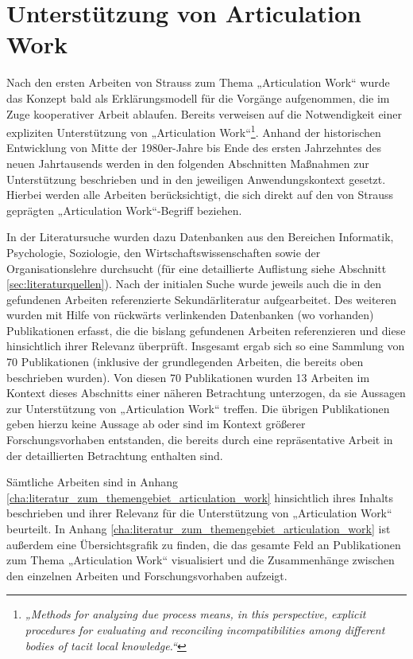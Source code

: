 
\section{Unterstützung von Articulation Work} %
\label{sec:unterstützung_von_articulation_work}

Nach den ersten Arbeiten von Strauss zum Thema „Articulation Work“ wurde das Konzept bald als Erklärungsmodell für die Vorgänge aufgenommen, die im Zuge kooperativer Arbeit ablaufen. Bereits \citeyear{Gerson86} verweisen \citeauthor{Gerson86} auf die Notwendigkeit einer expliziten Unterstützung von „Articulation Work“\footnote{\emph{„Methods for analyzing 
due process means, in this perspective, explicit procedures for evaluating and reconciling incompatibilities among different bodies of tacit local knowledge.“}\citep[][S. 266]{Gerson86}}. Anhand der historischen Entwicklung von Mitte der 1980er-Jahre bis Ende des ersten Jahrzehntes des neuen Jahrtausends werden in den folgenden Abschnitten Maßnahmen zur Unterstützung beschrieben und in den jeweiligen Anwendungskontext gesetzt. Hierbei werden alle Arbeiten berücksichtigt, die sich direkt auf den von Strauss geprägten „Articulation Work“-Begriff beziehen. 

In der Literatursuche wurden dazu Datenbanken aus den Bereichen Informatik, Psychologie, Soziologie, den Wirtschaftswissenschaften sowie der Organisationslehre durchsucht (für eine detaillierte Auflistung siehe Abschnitt \ref{sec:literaturquellen}). Nach der initialen Suche wurde jeweils auch die in den gefundenen Arbeiten referenzierte Sekundärliteratur aufgearbeitet. Des weiteren wurden mit Hilfe von rückwärts verlinkenden Datenbanken (wo vorhanden) Publikationen erfasst, die die bislang gefundenen Arbeiten referenzieren und diese hinsichtlich ihrer Relevanz überprüft. Insgesamt ergab sich so eine Sammlung von 70 Publikationen (inklusive der grundlegenden Arbeiten, die bereits oben beschrieben wurden). Von diesen 70 Publikationen wurden 13 Arbeiten im Kontext dieses Abschnitts einer näheren Betrachtung unterzogen, da sie Aussagen zur Unterstützung von „Articulation Work“ treffen. Die übrigen Publikationen geben hierzu keine Aussage ab oder sind im Kontext größerer Forschungsvorhaben entstanden, die bereits durch eine repräsentative Arbeit in der detaillierten Betrachtung enthalten sind. 

Sämtliche Arbeiten sind in Anhang \ref{cha:literatur_zum_themengebiet_articulation_work} hinsichtlich ihres Inhalts beschrieben und ihrer Relevanz für die Unterstützung von „Articulation Work“ beurteilt. In Anhang \ref{cha:literatur_zum_themengebiet_articulation_work} ist außerdem eine Übersichtsgrafik zu finden, die das gesamte Feld an Publikationen zum Thema „Articulation Work“ visualisiert und die Zusammenhänge zwischen den einzelnen Arbeiten und Forschungsvorhaben aufzeigt.

